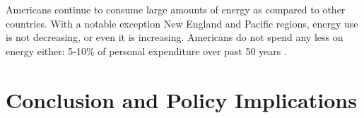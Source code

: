 \documentclass[10pt, letterpaper]{article}
\begin{document}
\begin{spacing}{1.5}
Americans continue to consume large amounts of energy as compared to other
countries.  With a notable exception New England and Pacific regions, energy use
is not decreasing, or even it is increasing. %
 Americans do not spend any less  on energy either: 5-10\% of personal
expenditure over past 50 years %
 \citep{bea-2-8-5}.


\section*{\large \bf Conclusion and Policy Implications} %


%


\end{spacing}
\end{document}

